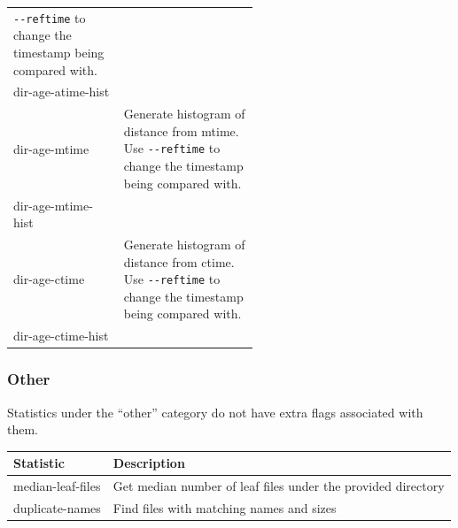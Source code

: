 \begin{longtable}{|l|p{0.55\linewidth}|}
  \texttt{-{}-reftime} to change the timestamp being compared with. \\
  dir-age-atime-hist & \\
  \hline
  dir-age-mtime & Generate histogram of distance from mtime. Use
  \texttt{-{}-reftime} to change the timestamp being compared with. \\
  dir-age-mtime-hist & \\
  \hline
  dir-age-ctime & Generate histogram of distance from ctime. Use
  \texttt{-{}-reftime} to change the timestamp being compared with. \\
  dir-age-ctime-hist & \\
  \hline
\end{longtable}

\subsubsection{Other}
Statistics under the ``other'' category do not have extra flags
associated with them.
\\
\begin{tabularx}{\textwidth}{| l | X |}
  \hline
  Statistic & Description \\
  \hline
  median-leaf-files & Get median number of leaf files under the provided
  directory \\
  \hline
  duplicate-names & Find files with matching names and sizes \\
  \hline
\end{tabularx}
